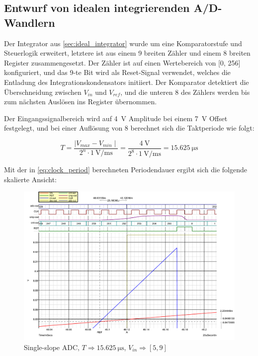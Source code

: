 \documentclass[
	ngerman,
	parskip=half,
	twocolumn,
	DIV=calc,
	]{scrartcl}
\begin{document}
		\subsection{Entwurf von idealen integrierenden A/D-Wandlern}
		
		\label{sec:single-slope-adc}		
	
		Der Integrator aus \cref{sec:ideal_integrator} wurde um eine Komparatorstufe und Steuerlogik erweitert, letztere ist aus einem \SI{9}{\bit} breiten Zähler und einem  \SI{8}{\bit} breiten Register zusammengesetzt. 
		Der Zähler ist auf einen Wertebereich von [0, 256] konfiguriert, und das 9-te Bit wird als Reset-Signal verwendet, welches die Entladung des Integrationskondensators initiiert.
		Der Komparator detektiert die Überschneidung zwischen $V_{in}$ und $V_{ref}$, und die unteren \SI{8}{\bit} des Zählers werden bis zum nächsten Auslösen ins Register übernommen.
		
		Der Eingangssignalbereich wird auf \SI{4}{\volt} Amplitude bei einem \SI{7}{\volt} Offset  festgelegt, und bei einer Auflösung von \SI{8}{\bit} berechnet sich die Taktperiode wie folgt: 
		
		\begin{equation}
		\label{eq:clock_period}
		T = \frac{\mid V_{max} - V_{min} \mid}{2^n  \cdot \SI{1}{\volt\per\milli\second}} = \frac{\SI{4}{\volt}}{2^8 \cdot \SI{1}{\volt\per\milli\second}} = \SI{15.625}{\micro\second}	
		\end{equation}
				
		Mit der in \cref{eq:clock_period} berechneten Periodendauer ergibt sich die folgende skalierte Ansicht: 
		
		\begin{figure}[h!]
			\centering
			\includegraphics[width=\linewidth]{ideal_single_slope_odd_freq_comparator_slew_rate_wide}
			\caption[Single-slope ADC (T = \SI{15.625}{\micro\second})]{Single-slope ADC, $T \Rightarrow \SI{15.625}{\micro\second}$, $V_{in} \Rightarrow [5,  9]$}
			\label{fig:single-slope-ideal-slew-rate}
		\end{figure}	
	
\end{document}
